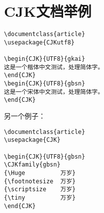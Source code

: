 \section{CJK文档举例}
\label{sec:zhCJK}

\begin{lstlisting}[language={[LaTex]Tex}]
\documentclass{article}
\usepackage{CJKutf8}

\begin{CJK}{UTF8}{gkai}
这是一个楷体中文测试，处理简体字。
\end{CJK}
\begin{CJK}{UTF8}{gbsn}
这是一个宋体中文测试，处理简体字。
\end{CJK}

\end{lstlisting}

另一个例子：
\begin{lstlisting}[language={[LaTex]Tex}]
\documentclass{article}
\usepackage{CJK}

\begin{CJK}{UTF8}{gbsn}
\CJKfamily{gbsn}
{\Huge          万岁}
{\footnotesize  万岁}
{\scriptsize    万岁}
{\tiny          万岁}
\end{CJK}

\end{lstlisting}


